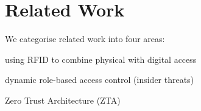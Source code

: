 \section{Related Work}\label{sec:related-work}

We categorise related work into four areas:

using RFID to combine physical with digital access
\cite{clarke-11}
\cite{ranasinghe-cole-06}
\cite{kriplean-et-al-07}
\cite{ostojic-et-al-07}
\cite{farooq-et-al-14}
\cite{larchikov-et-al-14}
\cite{woo-garcia-et-al-16}

dynamic role-based access control
\cite{uzun-et-al-12}
\cite{luo-et-al-16}
\cite{liu-et-al-18} (insider threats)
\cite{chatterjee-et-al-20}

Zero Trust Architecture (ZTA)
\cite{rose-et-al-20}
\cite{bertino-21}
\cite{garbis-chapman-21}
\cite{ross-et-al-21}
\cite{yao-et-al-21}
\cite{meng-et-al-22}
\cite{syed-et-al-22}

